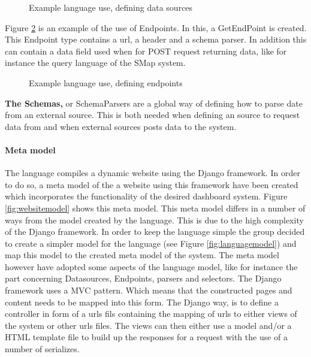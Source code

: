 \begin{figure}
\begin{center}

\end{center}
\caption{Example language use, defining data sources}
\label{fig:exampleDatasources}
\end{figure}

Figure \ref{fig:exampleEndpoints} is an example of the use of Endpoints.
In this, a GetEndPoint is created. This Endpoint type contains a url, a header and a schema parser.
In addition this can contain a data field used when for POST request returning data, like for instance the query language of the SMap system.
\begin{figure}
\begin{center}

\end{center}
\caption{Example language use, defining endpoints}
\label{fig:exampleEndpoints}
\end{figure}

\textbf{The Schemas,} or SchemaParsers are a global way of defining how to parse date from an external source.
This is both needed when defining an source to request data from and when external sources posts data to the system.

\paragraph{Meta model}
The language compiles a dynamic website using the Django framework.
In order to do so, a meta model of the a website using this framework
have been created which incorporates the functionality of the desired dashboard system.  
Figure \ref{fig:websitemodel} shows this meta model.
This meta model differs in a number of ways from the model created by the language.
This is due to the high complexity of the Django framework.
In order to keep the language simple the group decided to create a simpler model for the language (see Figure \ref{fig:languagemodel}) and map this model to the created meta model of the system.
The meta model however have adopted some aspects of the language model, like for instance the part concerning Datasources, Endpoints, parsers and selectors.
The Django framework uses a MVC pattern. 
Which means that the constructed pages and content needs to be mapped into this form.
The Django way, is to define a controller in form of a urls fils containing the mapping of urls to either views of the system or other urls files.
The views can then either use a model and/or a HTML template file to build up the responses for a request with the use of a number of serializes.


